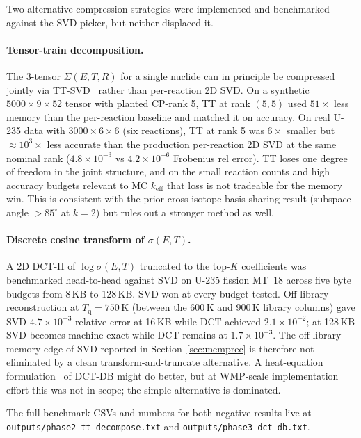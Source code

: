 Two alternative compression strategies were implemented and
benchmarked against the SVD picker, but neither displaced it.

\paragraph{Tensor-train decomposition.}
The 3-tensor $\Sigma(E, T, R)$ for a single nuclide can in principle
be compressed jointly via TT-SVD~\citep{oseledets2011tt} rather than
per-reaction 2D SVD. On a synthetic
$5000 \times 9 \times 52$ tensor with planted CP-rank 5, TT at rank
$(5,5)$ used $51\times$ less memory than the per-reaction baseline
and matched it on accuracy. On real U-235 data with
$3000 \times 6 \times 6$ (six reactions), TT at rank 5 was
$6\times$ smaller but $\approx 10^{3}\times$ less accurate than
the production per-reaction 2D SVD at the same nominal rank
($4.8 \times 10^{-3}$ vs $4.2 \times 10^{-6}$ Frobenius rel error).
TT loses one degree of freedom in the joint structure, and on the
small reaction counts and high accuracy budgets relevant to MC
$k_{\text{eff}}$ that loss is not tradeable for the memory win.
This is consistent with the prior cross-isotope basis-sharing
result (subspace angle $> 85^{\circ}$ at $k=2$) but rules out a
stronger method as well.

\paragraph{Discrete cosine transform of $\sigma(E,T)$.}
A 2D DCT-II of $\log\sigma(E,T)$ truncated to the top-$K$
coefficients was benchmarked head-to-head against SVD on
U-235 fission MT~18 across five byte budgets from 8\,KB to
128\,KB. SVD won at every budget tested. Off-library
reconstruction at $T_{\text{q}} = 750\,\mathrm{K}$ (between the
600\,K and 900\,K library columns) gave SVD $4.7 \times 10^{-3}$
relative error at 16\,KB while DCT achieved
$2.1 \times 10^{-2}$; at 128\,KB SVD becomes machine-exact while
DCT remains at $1.7 \times 10^{-3}$. The off-library memory edge
of SVD reported in
Section~\ref{sec:memprec} is therefore not eliminated by a clean
transform-and-truncate alternative. A heat-equation
formulation~\citep{ducru2017} of DCT-DB might do
better, but at WMP-scale implementation effort this was not in
scope; the simple alternative is dominated.

The full benchmark CSVs and numbers for both negative results live
at \texttt{outputs/phase2\_tt\_decompose.txt} and
\texttt{outputs/phase3\_dct\_db.txt}.
